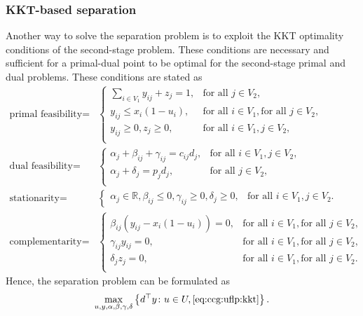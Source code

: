 \subsubsection*{KKT-based separation}
Another way to solve the separation problem is to exploit the KKT optimality
conditions of the second-stage problem. These conditions are necessary and
sufficient for a primal-dual point to be optimal for the second-stage primal
and dual problems. These conditions are stated as 
\begin{equation}
    \label{eq:ccg:uflp:kkt}
    \begin{aligned}
        \text{primal feasibility} = & 
        \begin{cases}
            \sum_{i\in V_1} y_{ij} + z_j = 1, & \text{for all } j\in V_2, \\
            y_{ij} \le x_i(1 - u_i), & \text{for all } i\in V_1, \text{for all } j\in V_2,  \\
            y_{ij}\ge 0, z_j \ge 0, & \text{for all } i\in V_1, j\in V_2, \\
        \end{cases} \\
        \text{dual feasibility} = & 
        \begin{cases}
            \alpha_j + \beta_{ij} + \gamma_{ij} = c_{ij}d_j, & \text{for all }i\in V_1, j\in V_2, \\
            \alpha_j + \delta_j = p_jd_j, & \text{for all } j\in V_2, \\
        \end{cases} \\
        \text{stationarity} = &
        \begin{cases}
            \alpha_j\in\mathbb{R}, \beta_{ij} \le 0, \gamma_{ij} \ge 0, \delta_j \ge 0, & \text{for all } i\in V_1, j\in V_2.
        \end{cases} \\
        \text{complementarity} = & 
        \begin{cases}
            \beta_{ij}(y_{ij} - x_i(1 - u_i)) = 0, & \text{for all } i\in V_1, \text{for all } j\in V_2, \\
            \gamma_{ij}y_{ij} = 0, & \text{for all } i\in V_1, \text{for all } j\in V_2, \\
            \delta_jz_j = 0, & \text{for all } i\in V_1, \text{for all } j\in V_2. \\
        \end{cases}
    \end{aligned}
\end{equation}
Hence, the separation problem can be formulated as 
\begin{align*}
    \max_{u,y,\alpha,\beta,\gamma,\delta} \left\{ d^\top y \colon u\in U, \eqref{eq:ccg:uflp:kkt} \right\}.
\end{align*}

